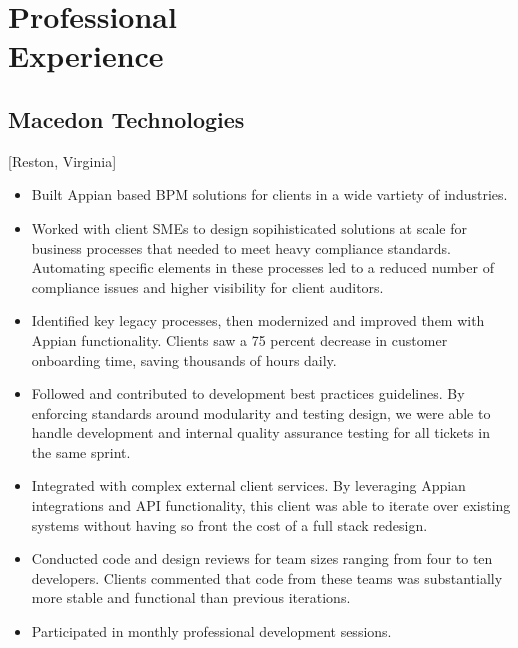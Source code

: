 \documentclass{mycv}
\begin{document}
\maketitle%

\section{Professional \\ Experience}

\subsection{Macedon Technologies}[Reston, Virginia]
\begin{positions}
\end{positions}

\begin{itemize}
  \item Built Appian based BPM solutions for clients in a wide vartiety of industries.
  \item Worked with client SMEs to design sopihisticated solutions at scale for business processes that needed to meet heavy compliance standards. Automating specific elements in these processes led to a reduced number  of compliance issues and higher visibility for client auditors.
  \item Identified key legacy processes, then modernized and improved them with Appian functionality. Clients saw a 75 percent decrease in customer onboarding time, saving thousands of hours daily.
  \item Followed and contributed to development best practices guidelines. By enforcing standards around modularity and testing design, we were able to handle development and internal quality assurance testing for all tickets in the same sprint.
  \item Integrated with complex external client services. By leveraging Appian integrations and API functionality, this client was able to iterate over existing systems without having so front the cost of a full stack redesign.
  \item Conducted code and design reviews for team sizes ranging from four to ten developers. Clients commented that code from these teams was substantially more stable and functional than previous iterations.
  \item Participated in monthly professional development sessions.
\end{itemize}
\end{document}
